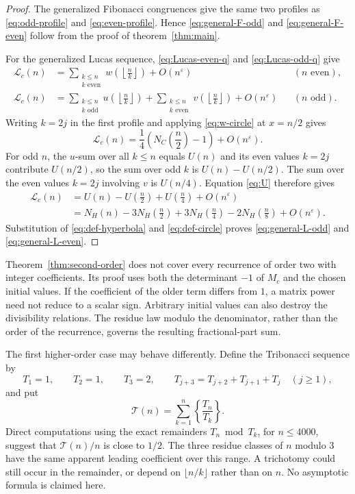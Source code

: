 \documentclass[11pt]{article}
\newcommand{\LL}{\mathcal L}
\newcommand{\TT}{\mathcal T}
\newcommand{\eps}{\varepsilon}
\begin{document}
\begin{proof}
The generalized Fibonacci congruences give the same two profiles as
\eqref{eq:odd-profile} and \eqref{eq:even-profile}. Hence
\eqref{eq:general-F-odd} and \eqref{eq:general-F-even} follow from the
proof of theorem~\ref{thm:main}.

For the generalized Lucas sequence, \eqref{eq:Lucas-even-q} and
\eqref{eq:Lucas-odd-q} give
\begin{align*}
 \LL_c(n)&=
 \sum_{\substack{k\leq n\\k\text{ even}}}
 w\left(\left\lfloor\frac nk\right\rfloor\right)
 +O(n^\eps)
 &&(n\text{ even}),\\
 \LL_c(n)&=
 \sum_{\substack{k\leq n\\k\text{ odd}}}
 u\left(\left\lfloor\frac nk\right\rfloor\right)
 +\sum_{\substack{k\leq n\\k\text{ even}}}
 v\left(\left\lfloor\frac nk\right\rfloor\right)
 +O(n^\eps)
 &&(n\text{ odd}).
\end{align*}
Writing $k=2j$ in the first profile and applying \eqref{eq:w-circle} at
$x=n/2$ gives
\[
 \LL_c(n)=\frac14\left(N_C\left(\frac n2\right)-1\right)
 +O(n^\eps).
\]
For odd $n$, the $u$-sum over all $k\leq n$ equals $U(n)$ and its even
values $k=2j$ contribute $U(n/2)$, so the sum over odd $k$ is
$U(n)-U(n/2)$. The sum over the even values $k=2j$ involving $v$ is
$U(n/4)$. Equation \eqref{eq:U} therefore gives
\begin{align*}
 \LL_c(n)
 &=U(n)-U\left(\frac n2\right)+U\left(\frac n4\right)
 +O(n^\eps)\\
 &=N_H(n)-3N_H\left(\frac n2\right)+3N_H\left(\frac n4\right)
 -2N_H\left(\frac n8\right)+O(n^\eps).
\end{align*}
Substitution of \eqref{eq:def-hyperbola} and \eqref{eq:def-circle} proves
\eqref{eq:general-L-odd} and \eqref{eq:general-L-even}.
\end{proof}

Theorem~\ref{thm:second-order} does not cover every recurrence of order two
with integer coefficients. Its proof uses both the determinant $-1$ of $M_c$
and the chosen initial values. If the coefficient of the older term
differs from $1$, a matrix power need not reduce to a scalar sign. Arbitrary
initial values can also destroy the divisibility relations. The residue law
modulo the denominator, rather than the order of the recurrence, governs the
resulting fractional-part sum.

The first higher-order case may behave differently. Define the
Tribonacci sequence by
\[
 T_1=1,\qquad T_2=1,\qquad T_3=2,\qquad
 T_{j+3}=T_{j+2}+T_{j+1}+T_j\quad (j\geq 1),
\]
and put
\[
 \TT(n)=\sum_{k=1}^{n}\left\{\frac{T_n}{T_k}\right\}.
\]
Direct computations using the exact remainders $T_n\bmod T_k$, for
$n\leq 4000$, suggest that $\TT(n)/n$ is close to $1/2$. The three residue
classes of $n$ modulo $3$ have the same apparent leading coefficient over
this range. A trichotomy could still occur in the remainder, or depend on
$\lfloor n/k\rfloor$ rather than on $n$. No asymptotic formula is claimed
here.
\end{document}
